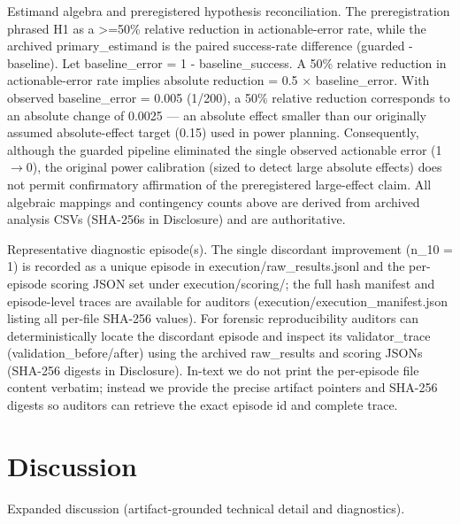 \documentclass[conference]{IEEEtran}
\begin{document}
Estimand algebra and preregistered hypothesis reconciliation. The preregistration phrased H1 as a >=50\% relative reduction in actionable-error rate, while the archived primary\_estimand is the paired success-rate difference (guarded - baseline). Let baseline\_error = 1 - baseline\_success. A 50\% relative reduction in actionable-error rate implies absolute reduction = 0.5 \ensuremath{\times} baseline\_error. With observed baseline\_error = 0.005 (1/200), a 50\% relative reduction corresponds to an absolute change of 0.0025 --- an absolute effect smaller than our originally assumed absolute-effect target (0.15) used in power planning. Consequently, although the guarded pipeline eliminated the single observed actionable error (1\ensuremath{\rightarrow}0), the original power calibration (sized to detect large absolute effects) does not permit confirmatory affirmation of the preregistered large-effect claim. All algebraic mappings and contingency counts above are derived from archived analysis CSVs (SHA-256s in Disclosure) and are authoritative.

Representative diagnostic episode(s). The single discordant improvement (n\_10 = 1) is recorded as a unique episode in execution/raw\_results.jsonl and the per-episode scoring JSON set under execution/scoring/; the full hash manifest and episode-level traces are available for auditors (execution/execution\_manifest.json listing all per-file SHA-256 values). For forensic reproducibility auditors can deterministically locate the discordant episode and inspect its validator\_trace (validation\_before/after) using the archived raw\_results and scoring JSONs (SHA-256 digests in Disclosure). In-text we do not print the per-episode file content verbatim; instead we provide the precise artifact pointers and SHA-256 digests so auditors can retrieve the exact episode id and complete trace.

\section{Discussion}
Expanded discussion (artifact-grounded technical detail and diagnostics).
\end{document}
